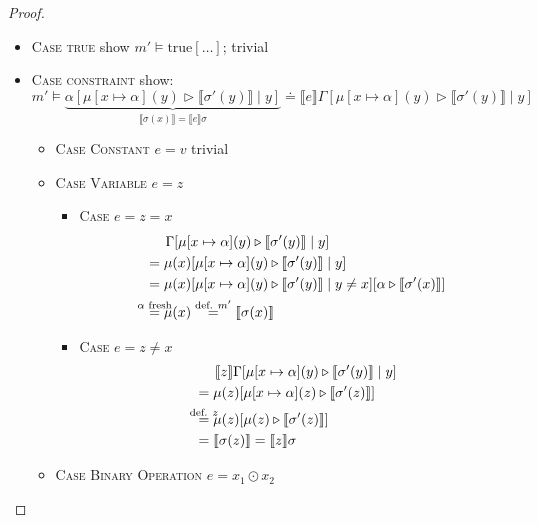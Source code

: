 \documentclass[twoside, english, final]{sdqthesis}
\newcommand{\bbracket}[1]{\llbracket #1 \rrbracket}
\newcommand{\tr}[0]{\triangleright}
\theoremstyle{definition}
\begin{document}
\begin{proof}
\begin{itemize}
      \begin{itemize}
        \item \textsc{Case true} show $m' \vDash \text{true}[\dots]$; trivial
        \item \textsc{Case constraint} show:
          $$ m' \vDash 
            \underbrace{\alpha[\mu[x\mapsto \alpha](y) \tr \bbracket{\sigma'(y)} \mid y]}_{\bbracket{\sigma(x)}=\bbracket{e}\sigma}
            \doteq 
            \bbracket{e}\Gamma[\mu[x\mapsto \alpha](y) \tr \bbracket{\sigma'(y)} \mid y]
          $$
          \begin{itemize}
            \item \textsc{Case Constant} $e=v$ trivial
            \item \textsc{Case Variable} $e=z$
              \begin{itemize}
                \item \textsc{Case $e=z=x$} 
                  \begin{align*}
                    &\phantom{=}\ \ \Gamma[\mu[x\mapsto \alpha](y) \tr \bbracket{\sigma'(y)} \mid y]
                    \\ &= \mu(x)[\mu[x\mapsto \alpha](y) \tr \bbracket{\sigma'(y)} \mid y]
                    \\ &= \mu(x)[\mu[x\mapsto \alpha](y) \tr \bbracket{\sigma'(y)} \mid y \neq x][\alpha \tr \bbracket{\sigma'(x)} ]
                    \\ &\overset{\mathclap{\alpha \text{ fresh}}}{=} \mu(x) 
                      \overset{\text{def. } m'}{=} \bbracket{\sigma(x)}
                  \end{align*}
                \item \textsc{Case $e = z \neq x$}
                  \begin{align*}
                    &\phantom{=}\ \ \bbracket{z}\Gamma[\mu[x\mapsto \alpha](y) \tr \bbracket{\sigma'(y)} \mid y]
                    \\ &= \mu(z)[\mu[x\mapsto \alpha](z) \tr \bbracket{\sigma'(z)}]
                    \\ &\overset{\mathclap{\text{def. } z}}{=} \mu(z)[\mu(z) \tr \bbracket{\sigma'(z)}]
                    \\ &=\bbracket{\sigma(z)} = \bbracket{z}\sigma
                  \end{align*}
              \end{itemize}
            \item \textsc{Case Binary Operation} $e = x_1 \odot x_2$
              \begin{itemize}

\end{itemize}
\end{itemize}
\end{itemize}
\end{itemize}
\end{proof}
\end{document}
